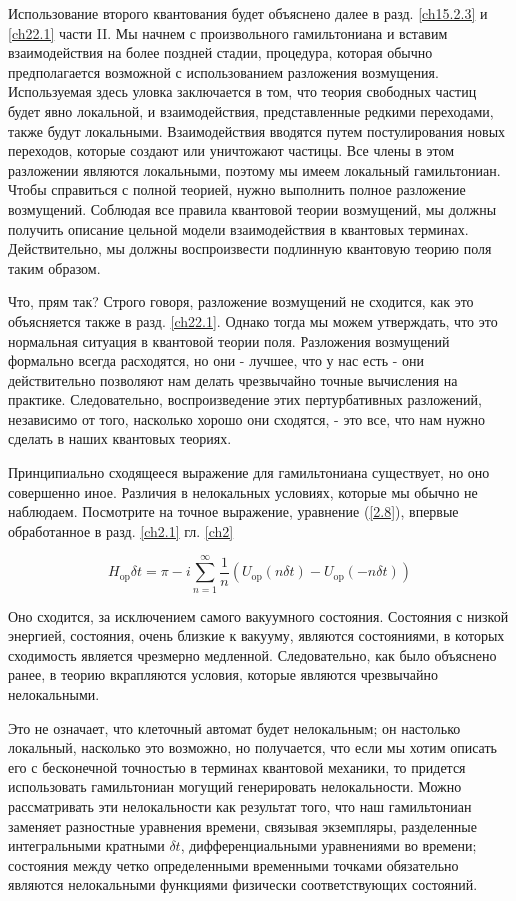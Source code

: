 \documentclass[main.tex]{subfiles}
\begin{document}
Использование второго квантования будет объяснено далее в разд. \ref{ch15.2.3} и \ref{ch22.1} части II. Мы начнем с произвольного гамильтониана и вставим взаимодействия на более поздней стадии, процедура, которая обычно предполагается возможной с использованием разложения возмущения. Используемая здесь уловка заключается в том, что теория свободных частиц будет явно локальной, и взаимодействия, представленные редкими переходами, также будут локальными. Взаимодействия вводятся путем постулирования новых переходов, которые создают или уничтожают частицы. Все члены в этом разложении являются локальными, поэтому мы имеем локальный гамильтониан. Чтобы справиться с полной теорией, нужно выполнить полное разложение возмущений. Соблюдая все правила квантовой теории возмущений, мы должны получить описание цельной модели взаимодействия в квантовых терминах. Действительно, мы должны воспроизвести подлинную квантовую теорию поля таким образом.

Что, прям так? Строго говоря, разложение возмущений не сходится, как это объясняется также в разд. \ref{ch22.1}. Однако тогда мы можем утверждать, что это нормальная ситуация в квантовой теории поля. Разложения возмущений формально всегда расходятся, но они - лучшее, что у нас есть - они действительно позволяют нам делать чрезвычайно точные вычисления на практике. Следовательно, воспроизведение этих пертурбативных разложений, независимо от того, насколько хорошо они сходятся, - это все, что нам нужно сделать в наших квантовых теориях.

Принципиально сходящееся выражение для гамильтониана существует, но оно совершенно иное. Различия в нелокальных условиях, которые мы обычно не наблюдаем. Посмотрите на точное выражение, уравнение (\ref{2.8}), впервые обработанное в разд. \ref{ch2.1} гл. \ref{ch2}

\begin{equation}\label{10.1}
	H_{\mathrm{op}} \delta t=\pi-i \sum_{n=1}^{\infty} \frac{1}{n}\left(U_{\mathrm{op}}(n \delta t)-U_{\mathrm{op}}(-n \delta t)\right)
\end{equation}

Оно сходится, за исключением самого вакуумного состояния. Состояния с низкой энергией, состояния, очень близкие к вакууму, являются состояниями, в которых сходимость является чрезмерно медленной. Следовательно, как было объяснено ранее, в теорию вкрапляются условия, которые являются чрезвычайно нелокальными.

Это не означает, что клеточный автомат будет нелокальным; он настолько локальный, насколько это возможно, но получается, что если мы хотим описать его с бесконечной точностью в терминах квантовой механики, то придется использовать гамильтониан могущий генерировать нелокальности. Можно рассматривать эти нелокальности как результат того, что наш гамильтониан заменяет разностные уравнения времени, связывая экземпляры, разделенные интегральными кратными $\delta t$, дифференциальными уравнениями во времени; состояния между четко определенными временными точками обязательно являются нелокальными функциями физически соответствующих состояний.
\end{document}
